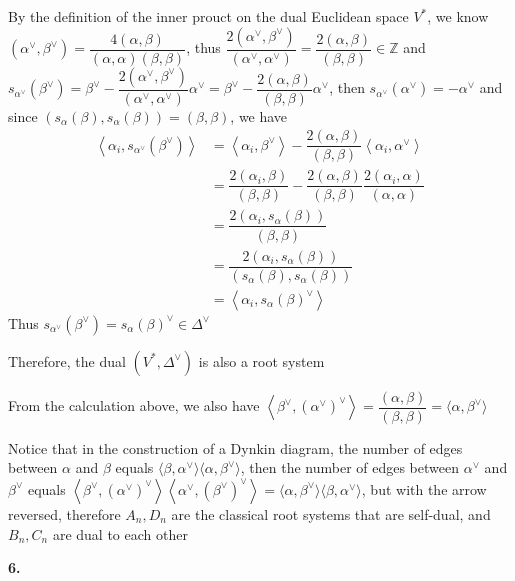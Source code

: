 \documentclass[10pt]{article}
\newcommand{\<}[1]{\langle #1 \rangle}
\begin{document}
By the definition of the inner prouct on the dual Euclidean space $V^*$, we know $(\alpha^\vee,\beta^\vee)=\dfrac{4(\alpha,\beta)}{(\alpha,\alpha)(\beta,\beta)}$, thus $\dfrac{2(\alpha^\vee,\beta^\vee)}{(\alpha^\vee,\alpha^\vee)}=\dfrac{2(\alpha,\beta)}{(\beta,\beta)}\in\mathbb Z$ and $s_{\alpha^\vee}(\beta^\vee)=\beta^\vee-\dfrac{2(\alpha^\vee,\beta^\vee)}{(\alpha^\vee,\alpha^\vee)}\alpha^\vee=\beta^\vee-\dfrac{2(\alpha,\beta)}{(\beta,\beta)}\alpha^\vee$, then $s_{\alpha^\vee}(\alpha^\vee)=-\alpha^\vee$ and since $(s_\alpha(\beta),s_\alpha(\beta))=(\beta,\beta)$, we have\begin{align*}
\left\langle\alpha_i,s_{\alpha^\vee}(\beta^\vee)\right\rangle&=\left\langle\alpha_i,\beta^\vee\right\rangle-\dfrac{2(\alpha,\beta)}{(\beta,\beta)}\left\langle\alpha_i,\alpha^\vee\right\rangle \\
&=\dfrac{2(\alpha_i,\beta)}{(\beta,\beta)}-\dfrac{2(\alpha,\beta)}{(\beta,\beta)}\dfrac{2(\alpha_i,\alpha)}{(\alpha,\alpha)} \\
&=\dfrac{2(\alpha_i,s_\alpha(\beta))}{(\beta,\beta)} \\
&=\dfrac{2(\alpha_i,s_\alpha(\beta))}{(s_\alpha(\beta),s_\alpha(\beta))} \\
&=\left\langle\alpha_i,s_\alpha(\beta)^\vee\right\rangle
\end{align*}Thus $s_{\alpha^\vee}(\beta^\vee)=s_\alpha(\beta)^\vee\in\Delta^\vee$ \par
Therefore, the dual $(V^*,\Delta^\vee)$ is also a root system \par
From the calculation above, we also have $\left\langle\beta^\vee,\left(\alpha^\vee\right)^\vee\right\rangle=\dfrac{(\alpha,\beta)}{(\beta,\beta)}=\langle\alpha,\beta^\vee\rangle$ \par
Notice that in the construction of a Dynkin diagram, the number of edges between $\alpha$ and $\beta$ equals $\langle\beta,\alpha^\vee\rangle\langle\alpha,\beta^\vee\rangle$, then the number of edges between $\alpha^\vee$ and $\beta^\vee$ equals $\left\langle\beta^\vee,\left(\alpha^\vee\right)^\vee\right\rangle\left\langle\alpha^\vee,\left(\beta^\vee\right)^\vee\right\rangle=\langle\alpha,\beta^\vee\rangle\langle\beta,\alpha^\vee\rangle$, but with the arrow reversed, therefore $A_n,D_n$ are the classical root systems that are self-dual, and $B_n,C_n$ are dual to each other \par
\textbf{6.} \par
\end{document}
